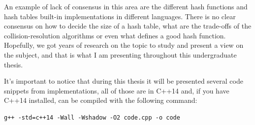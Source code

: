 An example of lack of consensus in this area are the different hash functions and hash tables built-in implementations in different languages. There is no clear consensus on how to decide the size of a hash table, what are the trade-offs of the collision-resolution algorithms or even what defines a good hash function. Hopefully, we got years of research on the topic to study and present a view on the subject, and that is what I am presenting throughout this undergraduate thesis.

It's important to notice that during this thesis it will be presented several code snippets from implementations, all of those are in C++14 and, if you have C++14 installed, can be compiled with the following command:

\begin{center}
  {\texttt{g++ -std=c++14 -Wall -Wshadow -O2 code.cpp -o code}}
\end{center}

